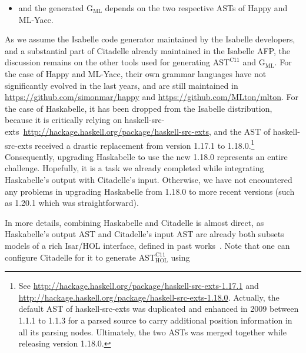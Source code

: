\begin{isabellebody}
\begin{isamarkuptext}
\begin{itemize}
\item and the generated $\text{G}_{\text{ML}}$ depends on the two respective ASTs of Happy and
ML-Yacc.%
\end{itemize}%
\end{isamarkuptext}\isamarkuptrue%
%
\begin{isamarkuptext}%
As we assume the Isabelle code generator maintained by the Isabelle developers, and a
substantial part of Citadelle already maintained in the Isabelle AFP, the discussion remains on the
other tools used for generating $\text{AST}^{\text{C11}}$ and $\text{G}_{\text{ML}}$. For the case
of Happy and ML-Yacc, their own grammar languages have not significantly evolved in the last years,
and are still maintained in \url{https://github.com/simonmar/happy} and
\url{https://github.com/MLton/mlton}. For the case of Haskabelle, it has been
dropped from the Isabelle distribution, because it is critically relying on
haskell-src-exts~\url{http://hackage.haskell.org/package/haskell-src-exts}, and the
AST of haskell-src-exts received a drastic replacement from version 1.17.1 to 1.18.0.\footnote{See \url{http://hackage.haskell.org/package/haskell-src-exts-1.17.1} and
  \url{http://hackage.haskell.org/package/haskell-src-exts-1.18.0}. Actually, the
  default AST of haskell-src-exts was duplicated and enhanced in 2009 between 1.1.1 to 1.1.3 for a
  parsed source to carry additional position information in all its parsing nodes. Ultimately, the
  two ASTs was merged together while releasing version 1.18.0.} Consequently, upgrading
Haskabelle to use the new 1.18.0 represents an entire challenge. Hopefully, it is a task we already
completed while integrating Haskabelle's output with Citadelle's input. Otherwise, we have not
encountered any problems in upgrading Haskabelle from 1.18.0 to more recent versions (such as 1.20.1
which was straightforward).%
\end{isamarkuptext}\isamarkuptrue%
%
\isadelimdocument
%
\endisadelimdocument
%
\isatagdocument
%
\isamarkuptrue%
%
\endisatagdocument
{\isafolddocument}%
%
\isadelimdocument
%
\endisadelimdocument
%
\begin{isamarkuptext}%
In more details, combining Haskabelle and Citadelle is almost direct, as Haskabelle's
output AST and Citadelle's input AST are already both subsets models of a rich Isar/HOL interface,
defined in past works~\cite{DBLP:journals/afp/TuongW15}. Note that one can configure Citadelle
for it to generate $\text{AST}^\text{C11}_{\text{HOL}}$ using

\end{isamarkuptext}
\end{isabellebody}
